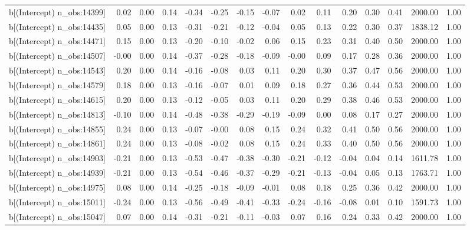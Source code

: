 \begin{table}[ht]
\begin{tabular}{rrrrrrrrrrrrrrr}
  b[(Intercept) n\_obs:14399] & 0.02 & 0.00 & 0.14 & -0.34 & -0.25 & -0.15 & -0.07 & 0.02 & 0.11 & 0.20 & 0.30 & 0.41 & 2000.00 & 1.00 \\ 
  b[(Intercept) n\_obs:14435] & 0.05 & 0.00 & 0.13 & -0.31 & -0.21 & -0.12 & -0.04 & 0.05 & 0.13 & 0.22 & 0.30 & 0.37 & 1838.12 & 1.00 \\ 
  b[(Intercept) n\_obs:14471] & 0.15 & 0.00 & 0.13 & -0.20 & -0.10 & -0.02 & 0.06 & 0.15 & 0.23 & 0.31 & 0.40 & 0.50 & 2000.00 & 1.00 \\ 
  b[(Intercept) n\_obs:14507] & -0.00 & 0.00 & 0.14 & -0.37 & -0.28 & -0.18 & -0.09 & -0.00 & 0.09 & 0.17 & 0.28 & 0.36 & 2000.00 & 1.00 \\ 
  b[(Intercept) n\_obs:14543] & 0.20 & 0.00 & 0.14 & -0.16 & -0.08 & 0.03 & 0.11 & 0.20 & 0.30 & 0.37 & 0.47 & 0.56 & 2000.00 & 1.00 \\ 
  b[(Intercept) n\_obs:14579] & 0.18 & 0.00 & 0.13 & -0.16 & -0.07 & 0.01 & 0.09 & 0.18 & 0.27 & 0.36 & 0.44 & 0.53 & 2000.00 & 1.00 \\ 
  b[(Intercept) n\_obs:14615] & 0.20 & 0.00 & 0.13 & -0.12 & -0.05 & 0.03 & 0.11 & 0.20 & 0.29 & 0.38 & 0.46 & 0.53 & 2000.00 & 1.00 \\ 
  b[(Intercept) n\_obs:14813] & -0.10 & 0.00 & 0.14 & -0.48 & -0.38 & -0.29 & -0.19 & -0.09 & 0.00 & 0.08 & 0.17 & 0.27 & 2000.00 & 1.00 \\ 
  b[(Intercept) n\_obs:14855] & 0.24 & 0.00 & 0.13 & -0.07 & -0.00 & 0.08 & 0.15 & 0.24 & 0.32 & 0.41 & 0.50 & 0.56 & 2000.00 & 1.00 \\ 
  b[(Intercept) n\_obs:14861] & 0.24 & 0.00 & 0.13 & -0.08 & -0.02 & 0.08 & 0.15 & 0.24 & 0.33 & 0.40 & 0.50 & 0.56 & 2000.00 & 1.00 \\ 
  b[(Intercept) n\_obs:14903] & -0.21 & 0.00 & 0.13 & -0.53 & -0.47 & -0.38 & -0.30 & -0.21 & -0.12 & -0.04 & 0.04 & 0.14 & 1611.78 & 1.00 \\ 
  b[(Intercept) n\_obs:14939] & -0.21 & 0.00 & 0.13 & -0.54 & -0.46 & -0.37 & -0.29 & -0.21 & -0.13 & -0.04 & 0.05 & 0.13 & 1763.71 & 1.00 \\ 
  b[(Intercept) n\_obs:14975] & 0.08 & 0.00 & 0.14 & -0.25 & -0.18 & -0.09 & -0.01 & 0.08 & 0.18 & 0.25 & 0.36 & 0.42 & 2000.00 & 1.00 \\ 
  b[(Intercept) n\_obs:15011] & -0.24 & 0.00 & 0.13 & -0.56 & -0.49 & -0.41 & -0.33 & -0.24 & -0.16 & -0.08 & 0.01 & 0.10 & 1591.73 & 1.00 \\ 
  b[(Intercept) n\_obs:15047] & 0.07 & 0.00 & 0.14 & -0.31 & -0.21 & -0.11 & -0.03 & 0.07 & 0.16 & 0.24 & 0.33 & 0.42 & 2000.00 & 1.00 \\ 

\end{tabular}
\end{table}
